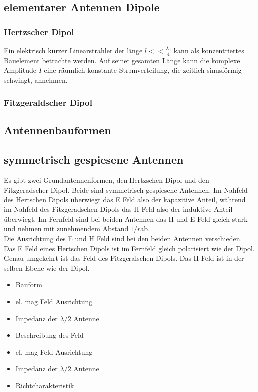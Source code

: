 \subsection{elementarer Antennen Dipole}
\subsubsection{Hertzscher Dipol}
Ein elektrisch kurzer Linearstrahler der länge $l<<\frac{\lambda_{0}}{4}$ kann als konzentriertes Bauelement betrachte werden. Auf seiner gesamten Länge kann die komplexe Amplitude $\underline{I}$ eine räumlich konstante Stromverteilung, die zeitlich sinusförmig schwingt, annehmen.
\subsubsection{Fitzgeraldscher Dipol}
\subsection{Antennenbauformen}
\subsection{symmetrisch gespiesene Antennen}

Es gibt zwei Grundantennenformen, den Hertzschen Dipol und den Fitzgeradscher Dipol. Beide sind symmetrisch gespiesene Antennen. Im Nahfeld des Hertschen Dipols überwiegt das E Feld also der kapazitive Anteil, während im Nahfeld des Fitzgeradschen Dipols das H Feld also der induktive Anteil überwiegt. Im Fernfeld sind bei beiden Antennen das H und E Feld gleich stark und nehmen mit zunehmendem Abstand $1/r$ab. \\
Die Ausrichtung des E und H Feld sind bei den beiden Antennen verschieden. \\
Das E Feld eines Hertschen Dipols ist im Fernfeld gleich polarisiert wie der Dipol. \\
Genau umgekehrt ist das Feld des Fitzgeralschen Dipols. Das H Feld ist in der selben Ebene wie der Dipol. 

\begin{itemize}
\item Bauform
\item el. mag Feld Ausrichtung
\item Impedanz der $\lambda /2 $ Antenne
\item Beschreibung des Feld
\item el. mag Feld Ausrichtung
\item Impedanz der $\lambda /2 $ Antenne
\item Richtcharakteristik
\end{itemize}
